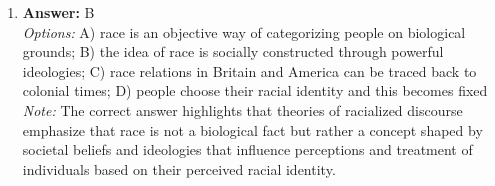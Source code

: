 \documentclass[12pt]{article}
\begin{document}
\begin{enumerate}[label=\arabic*.]
\\ \textit{Options:} A) the mass production of standardized products for passive audiences; B) television based on producer-broadcaster rather than publisher-broadcaster models; C) a diverse range of products aimed at niche markets; D) increasing numbers of advertisements for motoring and car-related products
\\ \textit{Note:} The correct answer reflects the key concept of Post-Fordism, which emphasizes flexibility and specialization in production processes, resulting in a diverse array of media products tailored to specific niche markets rather than mass production for a general audience.
\item \textbf{Answer:} B
\\ \textit{Options:} A) race is an objective way of categorizing people on biological grounds; B) the idea of race is socially constructed through powerful ideologies; C) race relations in Britain and America can be traced back to colonial times; D) people choose their racial identity and this becomes fixed
\\ \textit{Note:} The correct answer highlights that theories of racialized discourse emphasize that race is not a biological fact but rather a concept shaped by societal beliefs and ideologies that influence perceptions and treatment of individuals based on their perceived racial identity.
\end{enumerate}
\end{document}
